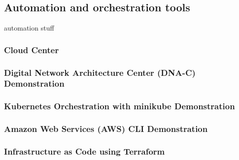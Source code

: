 \subsection{Automation and orchestration tools}
automation stuff

\subsubsection{Cloud Center}
\subsubsection{Digital Network Architecture Center (DNA-C) Demonstration}
\subsubsection{Kubernetes Orchestration with minikube Demonstration}
\subsubsection{Amazon Web Services (AWS) CLI Demonstration}
\subsubsection{Infrastructure as Code using Terraform}
